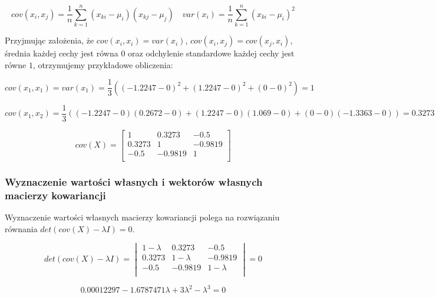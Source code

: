 \documentclass{article}
\begin{document}
\begin{equation}
    cov(x_i, x_j) = \frac{1}{n} \sum_{k=1}^{n} (x_{ki} - \mu_i)(x_{kj} - \mu_j) \quad
    var(x_i) = \frac{1}{n} \sum_{k=1}^{n} (x_{ki} - \mu_i)^2
\end{equation}

Przyjmując założenia, że $cov(x_i, x_i) = var(x_i)$, $cov(x_i, x_j) = cov(x_j, x_i)$,
średnia każdej cechy jest równa $0$ oraz odchylenie standardowe każdej cechy jest równe $1$,
otrzymujemy przykładowe obliczenia:

\begin{equation*}
    cov(x_1, x_1) = var(x_1) = \frac{1}{3} ((-1.2247 - 0)^2 + (1.2247 - 0)^2 + (0 - 0)^2) = 1
\end{equation*}

\begin{equation*}
    cov(x_1, x_2) = \frac{1}{3} ((-1.2247 - 0)(0.2672 - 0) + (1.2247 - 0)(1.069 - 0) + (0 - 0)(-1.3363 - 0)) = 0.3273
\end{equation*}

\begin{equation}
    cov(X) = 
    \begin{bmatrix}
        1 & 0.3273 & -0.5 \\
        0.3273 & 1 & -0.9819 \\
        -0.5 & -0.9819 & 1 \\
    \end{bmatrix}
\end{equation}

\subsubsection*{Wyznaczenie wartości własnych i wektorów własnych macierzy kowariancji}

Wyznaczenie wartości własnych macierzy kowariancji
polega na rozwiązaniu równania $det(cov(X) - \lambda I) = 0$.

\begin{equation}
    det(cov(X) - \lambda I) = 
    \begin{vmatrix}
        1 - \lambda & 0.3273 & -0.5 \\
        0.3273 & 1 - \lambda & -0.9819 \\
        -0.5 & -0.9819 & 1 - \lambda \\
    \end{vmatrix} = 0
\end{equation}

\begin{equation*}
    0.00012297 - 1.6787471\lambda+3\lambda^2-\lambda^3 = 0
\end{equation*}
\end{document}
